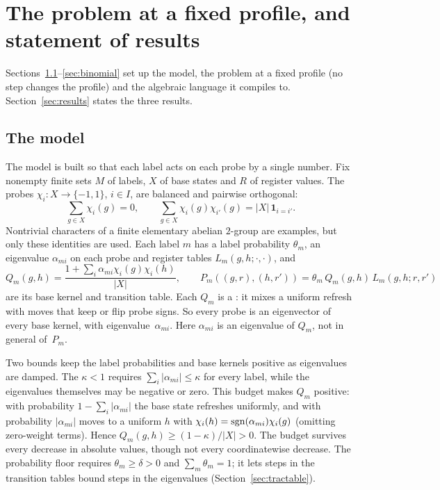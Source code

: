 
\section{The problem at a fixed profile, and statement of results}\label{sec:problem}

Sections~\ref{sec:model}--\ref{sec:binomial} set up the model, the problem
at a fixed profile (no step changes the profile) and the algebraic language
it compiles to. Section~\ref{sec:results} states the three results.

\subsection{The model}\label{sec:model}

The model is built so that each label acts on each probe by a single
number. Fix nonempty finite sets $M$ of labels, $X$ of base states and $R$
of register values. The probes $\chi_i:X\to\{-1,1\}$, $i\in I$, are
balanced and pairwise orthogonal:
\[
  \sum_{g\in X}\chi_i(g)=0,\qquad
  \sum_{g\in X}\chi_i(g)\chi_{i'}(g)=|X|\,\mathbf 1_{i=i'} .
\]
Nontrivial characters of a finite elementary abelian $2$-group are examples,
but only these identities are used. Each label $m$ has a label probability
$\theta_m$, an eigenvalue $\alpha_{mi}$ on each probe and register tables
$L_m(g,h;\cdot,\cdot)$, and
\[
  Q_m(g,h)=\frac{1+\sum_i\alpha_{mi}\chi_i(g)\chi_i(h)}{|X|},\qquad
  P_m((g,r),(h,r'))=\theta_m\,Q_m(g,h)\,L_m(g,h;r,r')
\]
are its base kernel and transition table. Each $Q_m$ is a
: it mixes a uniform refresh with moves that keep or
flip probe signs. So every probe is an eigenvector of every base kernel,
with eigenvalue~$\alpha_{mi}$. Here $\alpha_{mi}$ is an eigenvalue of $Q_m$,
not in general of~$P_m$.

Two bounds keep the label probabilities and base kernels positive as
eigenvalues are damped. The  $\kappa<1$ requires
$\sum_i|\alpha_{mi}|\le\kappa$ for every label, while the eigenvalues
themselves may be negative or zero. This budget makes $Q_m$ positive: with
probability $1-\sum_i|\alpha_{mi}|$ the base state refreshes uniformly,
and with probability $|\alpha_{mi}|$ moves to a uniform $h$ with
$\chi_i(h)=\operatorname{sgn}(\alpha_{mi})\chi_i(g)$ (omitting zero-weight terms).
Hence $Q_m(g,h)\ge(1-\kappa)/|X|>0$. The budget survives every decrease in
absolute values, though not every coordinatewise decrease. The probability
floor requires $\theta_m\ge\delta>0$ and
$\sum_m\theta_m=1$; it lets steps in the transition tables bound steps in
the eigenvalues (Section~\ref{sec:tractable}).

